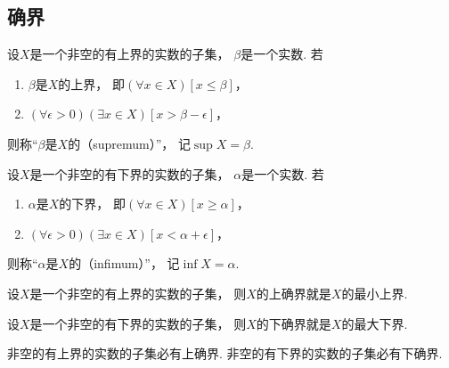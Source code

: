 \subsection{确界}
\begin{definition}
设\(X\)是一个非空的有上界的实数的子集，
\(\beta\)是一个实数.
若\begin{enumerate}
	\item \(\beta\)是\(X\)的上界，
	即\((\forall x \in X)[x \leq \beta]\)，

	\item \((\forall \epsilon>0)(\exists x \in X)[x>\beta-\epsilon]\)，
\end{enumerate}
则称“\(\beta\)是\(X\)的（supremum）”，
记\(\sup X = \beta\).
\end{definition}

\begin{definition}
设\(X\)是一个非空的有下界的实数的子集，
\(\alpha\)是一个实数.
若\begin{enumerate}
	\item \(\alpha\)是\(X\)的下界，
	即\((\forall x \in X)[x \geq \alpha]\)，

	\item \((\forall \epsilon>0)(\exists x \in X)[x<\alpha+\epsilon]\)，
\end{enumerate}
则称“\(\alpha\)是\(X\)的（infimum）”，
记\(\inf X = \alpha\).
\end{definition}

\begin{proposition}
设\(X\)是一个非空的有上界的实数的子集，
则\(X\)的上确界就是\(X\)的最小上界.
\end{proposition}

\begin{proposition}
设\(X\)是一个非空的有下界的实数的子集，
则\(X\)的下确界就是\(X\)的最大下界.
\end{proposition}


\begin{theorem}[确界原理]\label{theorem:实数.确界原理}
非空的有上界的实数的子集必有上确界.
非空的有下界的实数的子集必有下确界.
\end{theorem}


